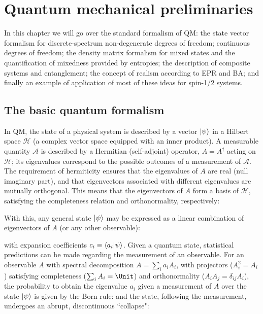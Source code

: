 \documentclass[12pt,a4paper,notitlepage]{report}
\begin{document}
\pagebreak  
  
\chapter{Quantum mechanical preliminaries}
\label{chap:qm}

In this chapter we will go over the standard formalism of QM: the state vector formalism for discrete-spectrum non-degenerate degrees of freedom; continuous degrees of freedom; the density matrix formalism for mixed states and the quantification of mixedness provided by entropies; the description of composite systems and entanglement; the concept of realism according to EPR and BA; and finally an example of application of most of these ideas for spin-1/2 systems.

\section{The basic quantum formalism}


In QM, the state of a physical system is described by a vector $\ket{\psi}$ in a Hilbert space $\mathcal{H}$ (a complex vector space equipped with an inner product).  A measurable quantity $\mathcal{A}$ is described by a Hermitian (self-adjoint) operator, $A = A^\dagger$ acting on $\mathcal{H}$; its eigenvalues correspond to the possible outcomes of a measurement of $\mathcal{A}$. The requirement of hermiticity ensures that the eigenvalues of $A$ are real (null imaginary part), and that eigenvectors associated with different eigenvalues are mutually orthogonal. This means that the eigenvectors of $A$ form a basis of $\mathcal{H}$, satisfying the completeness relation and orthonormality, respectively:

%
With this, any general state $\ket{\psi}$ may be expressed as a linear combination of eigenvectors of $A$ (or any other observable):

%
with expansion coefficients $c_i \equiv \bra{a_i}\ket{\psi}$. Given a quantum state, statistical predictions can be made regarding the measurement of an observable. For an observable $A$ with spectral decomposition $A = \sum_i a_i A_i$, with projectors ($A_i^2 = A_i$) satisfying completeness ($\sum_i A_i = \Unit$) and orthonormality ($A_iA_j = \delta_{ij}A_i$), the probability to obtain the eigenvalue $a_i$ given a measurement of $A$ over the state $\ket{\psi}$ is given by the Born rule:
%
%
and the state, following the measurement, undergoes an abrupt, discontinuous ``collapse":
\end{document}
